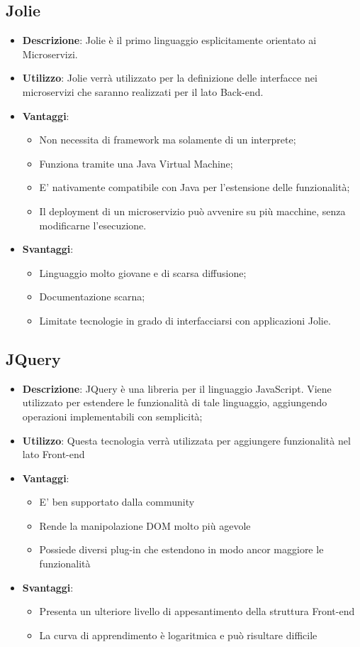 \subsection{Jolie}
\begin{itemize}
	\item \textbf{Descrizione}: Jolie è il primo linguaggio esplicitamente orientato ai Microservizi. 
	\item \textbf{Utilizzo}: Jolie verrà utilizzato per la definizione delle interfacce nei microservizi che saranno realizzati per il lato Back-end.
	\item \textbf{Vantaggi}:
	\begin{itemize}
		\item Non necessita di framework ma solamente di un interprete;
		\item Funziona tramite una Java Virtual Machine;
		\item E' nativamente compatibile con Java per l'estensione delle funzionalità;
		\item Il deployment di un microservizio può avvenire su più macchine, senza modificarne l'esecuzione.
	\end{itemize}
	\item \textbf{Svantaggi}:
	\begin{itemize}
		\item Linguaggio molto giovane e di scarsa diffusione;
		\item Documentazione scarna;
		\item Limitate tecnologie in grado di interfacciarsi con applicazioni Jolie.
	\end{itemize}
\end{itemize}

\subsection{JQuery}
\begin{itemize}
	\item \textbf{Descrizione}: JQuery è una libreria per il linguaggio JavaScript. Viene utilizzato per estendere le funzionalità di tale linguaggio, aggiungendo operazioni implementabili con semplicità;
	\item \textbf{Utilizzo}: Questa tecnologia verrà utilizzata per aggiungere funzionalità nel lato Front-end
	\item \textbf{Vantaggi}:
	\begin{itemize}
		\item E' ben supportato dalla community
		\item Rende la manipolazione DOM molto più agevole
		\item Possiede diversi plug-in che estendono in modo ancor maggiore le funzionalità
	\end{itemize}
	\item \textbf{Svantaggi}:
	\begin{itemize}
		\item Presenta un ulteriore livello di appesantimento della struttura Front-end
		\item La curva di apprendimento è logaritmica e può risultare difficile
	\end{itemize}
\end{itemize}

